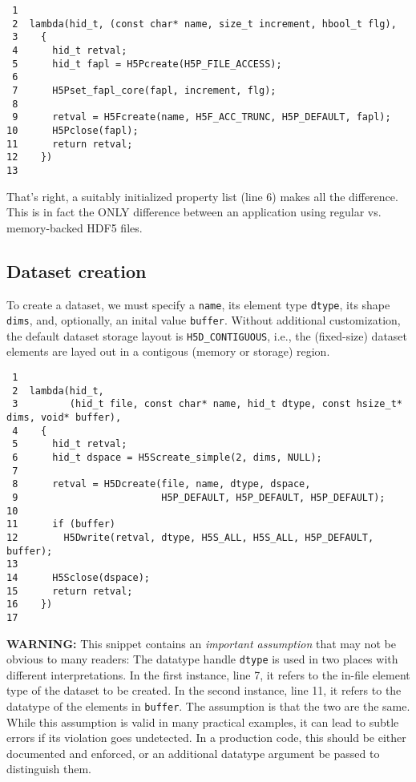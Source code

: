 \documentclass[a4paper, 12pt]{article}
\begin{document}
\begin{verbatim}
 1
 2  lambda(hid_t, (const char* name, size_t increment, hbool_t flg),
 3    {
 4      hid_t retval;
 5      hid_t fapl = H5Pcreate(H5P_FILE_ACCESS);
 6
 7      H5Pset_fapl_core(fapl, increment, flg);
 8
 9      retval = H5Fcreate(name, H5F_ACC_TRUNC, H5P_DEFAULT, fapl);
10      H5Pclose(fapl);
11      return retval;
12    })
13
\end{verbatim}

That's right, a suitably initialized property list (line 6) makes
all the difference. This is in fact the ONLY difference between an
application using regular vs. memory-backed HDF5 files.

\subsection{Dataset creation \label{org38d97dd}}
\label{sec:orgc7b7d01}

To create a dataset, we must specify a \texttt{name}, its element type \texttt{dtype}, its
shape \texttt{dims}, and, optionally, an inital value \texttt{buffer}. Without additional
customization, the default dataset storage layout is \texttt{H5D\_CONTIGUOUS}, i.e.,
the (fixed-size) dataset elements are layed out in a contigous (memory
or storage) region.

\begin{verbatim}
 1
 2  lambda(hid_t,
 3         (hid_t file, const char* name, hid_t dtype, const hsize_t* dims, void* buffer),
 4    {
 5      hid_t retval;
 6      hid_t dspace = H5Screate_simple(2, dims, NULL);
 7
 8      retval = H5Dcreate(file, name, dtype, dspace,
 9                         H5P_DEFAULT, H5P_DEFAULT, H5P_DEFAULT);
10
11      if (buffer)
12        H5Dwrite(retval, dtype, H5S_ALL, H5S_ALL, H5P_DEFAULT, buffer);
13
14      H5Sclose(dspace);
15      return retval;
16    })
17
\end{verbatim}

\textbf{\textbf{WARNING:}} This snippet contains an \emph{important assumption} that may not be
obvious to many readers: The datatype handle \texttt{dtype} is used in two places
with different interpretations. In the first instance, line 7,
it refers to the in-file element type of the dataset to be created. In the
second instance, line 11, it refers to the datatype of the
elements in \texttt{buffer}. The assumption is that the two are the same. While this
assumption is valid in many practical examples, it can lead to subtle errors
if its violation goes undetected. In a production code, this should be
either documented and enforced, or an additional datatype argument be passed
to distinguish them.
\end{document}
